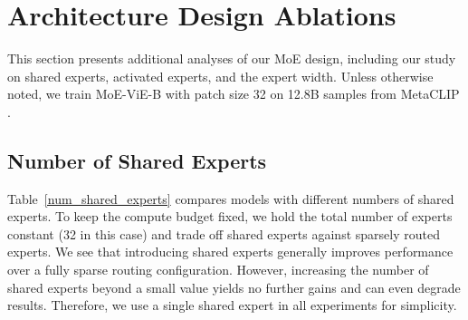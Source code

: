 \documentclass[runningheads]{llncs}
\begin{document}
\appendix

\section{Architecture Design Ablations}
\label{supp_a}

This section presents additional analyses of our MoE design, including our study on shared experts, activated experts, and the expert width. Unless otherwise noted, we train MoE-ViE-B with patch size 32 on 12.8B samples from MetaCLIP \cite{metaclip}.


\subsection{Number of Shared Experts}

Table~\ref{num_shared_experts} compares models with different numbers of shared experts. To keep the compute budget fixed, we hold the total number of experts constant (32 in this case) and trade off shared experts against sparsely routed experts. We see that introducing shared experts generally improves performance over a fully sparse routing configuration. However, increasing the number of shared experts beyond a small value yields no further gains and can even degrade results. Therefore, we use a single shared expert in all experiments for simplicity.
\end{document}
